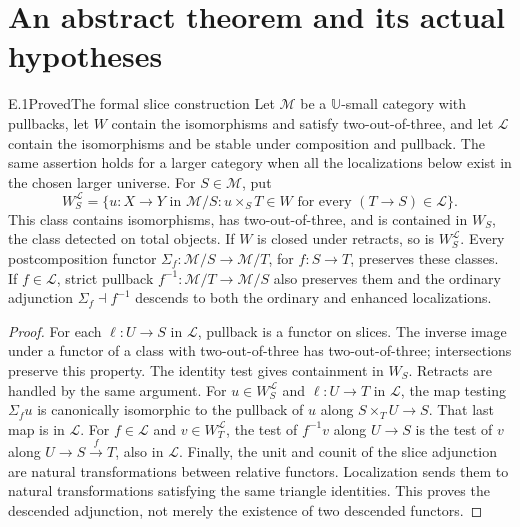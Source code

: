\section{An abstract theorem and its actual hypotheses}

\begin{claim}{E.1}{Proved}{The formal slice construction}
Let $\mathcal M$ be a $\mathbb U$-small category with pullbacks, let $W$ contain the isomorphisms and satisfy two-out-of-three, and let $\mathcal L$ contain the isomorphisms and be stable under composition and pullback. The same assertion holds for a larger category when all the localizations below exist in the chosen larger universe. For $S\in\mathcal M$, put
\[
 W_S^{\mathcal L}=\{u:X\to Y\text{ in }\mathcal M/S:
 u\times_S T\in W\text{ for every }(T\to S)\in\mathcal L\}.
\]
This class contains isomorphisms, has two-out-of-three, and is contained in $W_S$, the class detected on total objects. If $W$ is closed under retracts, so is $W_S^{\mathcal L}$. Every postcomposition functor $\Sigma_f:\mathcal M/S\to\mathcal M/T$, for $f:S\to T$, preserves these classes. If $f\in\mathcal L$, strict pullback $f^{-1}:\mathcal M/T\to\mathcal M/S$ also preserves them and the ordinary adjunction $\Sigma_f\dashv f^{-1}$ descends to both the ordinary and enhanced localizations.
\end{claim}
\begin{proof}
For each $\ell:U\to S$ in $\mathcal L$, pullback is a functor on slices. The inverse image under a functor of a class with two-out-of-three has two-out-of-three; intersections preserve this property. The identity test gives containment in $W_S$. Retracts are handled by the same argument. For $u\in W_S^{\mathcal L}$ and $\ell:U\to T$ in $\mathcal L$, the map testing $\Sigma_fu$ is canonically isomorphic to the pullback of $u$ along $S\times_TU\to S$. That last map is in $\mathcal L$. For $f\in\mathcal L$ and $v\in W_T^{\mathcal L}$, the test of $f^{-1}v$ along $U\to S$ is the test of $v$ along $U\to S\xrightarrow fT$, also in $\mathcal L$. Finally, the unit and counit of the slice adjunction are natural transformations between relative functors. Localization sends them to natural transformations satisfying the same triangle identities. This proves the descended adjunction, not merely the existence of two descended functors.
\end{proof}


